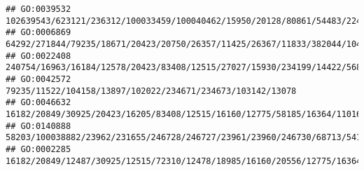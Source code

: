 \documentclass[
]{article}
\begin{document}
\begin{verbatim}
## GO:0039532                                                                                                                                                                                                                                                                                                                                   102639543/623121/236312/100033459/100040462/15950/20128/80861/54483/224762
## GO:0006869                                                                                                                                                                                                                    64292/271844/79235/18671/20423/20750/26357/11425/26367/11833/382044/104158/13897/11808/66113/20897/272636/216225/268379/16204/18126/76408/20533/27404/12684/18095/21943/11815/14419/12780
## GO:0022408                                                                                                                                                                                                                                                                                     240754/16963/16184/12578/20423/83408/12515/27027/15930/234199/14422/56838/100043314/208154/14960/16149/60533/58205/20371
## GO:0042572                                                                                                                                                                                                                                                                                                                                                   79235/11522/104158/13897/102022/234671/234673/103142/13078
## GO:0046632                                                                                                                                                                                                                                                                                                                  16182/20849/30925/20423/16205/83408/12515/16160/12775/58185/16364/110168/321019/20371/16186
## GO:0140888                                                                                                                                                                                                                                                                                                                      58203/100038882/23962/231655/246728/246727/23961/23960/246730/68713/54123/434341/547253
## GO:0002285                                                                                                                                                                                                                                                                                     16182/20849/12487/30925/12515/72310/12478/18985/16160/20556/12775/16364/17079/321019/12458/57757/15000/14999/16149/20371

\end{verbatim}
\end{document}

